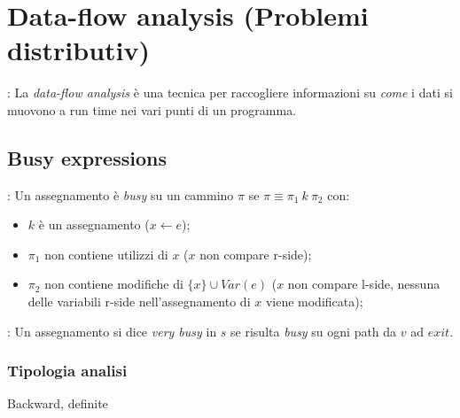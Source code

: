 \documentclass[a4paper, 10pt]{book}
\newenvironment{definition}[1][Definizione]{\begin{trivlist}
\item[\hskip \labelsep {\bfseries #1}]}{\end{trivlist}}
\begin{document}
\section{Data-flow analysis (Problemi distributiv)}
\begin{definition}[Data-flow analysis]:
    La \emph{data-flow analysis} è una tecnica per raccogliere informazioni su \emph{come} i dati si muovono
    a run time nei vari punti di un programma.
\end{definition}

\newpage
\subsection{Busy expressions}
\begin{definition}[Very busy expression]:
    Un assegnamento è \textit{busy} su un cammino $\pi$ se $\pi \equiv \pi_1 ~k~ \pi_2$ con:
    \begin{itemize}
    	\item $k$ è un assegnamento ($x\gets e$);
    	\item $\pi_1$ non contiene utilizzi di $x$ ($x$ non compare r-side);
    	\item $\pi_2$ non contiene modifiche di $\{x\}\cup Var(e)$ ($x$ non compare l-side, nessuna delle 
    	    variabili r-side nell'assegnamento di $x$ viene modificata);
    \end{itemize}
\end{definition}

\begin{definition}[Very busy expression]:
    Un assegnamento si dice \emph{very busy} in $s$ se risulta \emph{busy} su ogni path da $v$ ad $exit$.
\end{definition}

\subsubsection{Tipologia analisi}
\begin{center}
    Backward, definite
\end{center}
\end{document}
